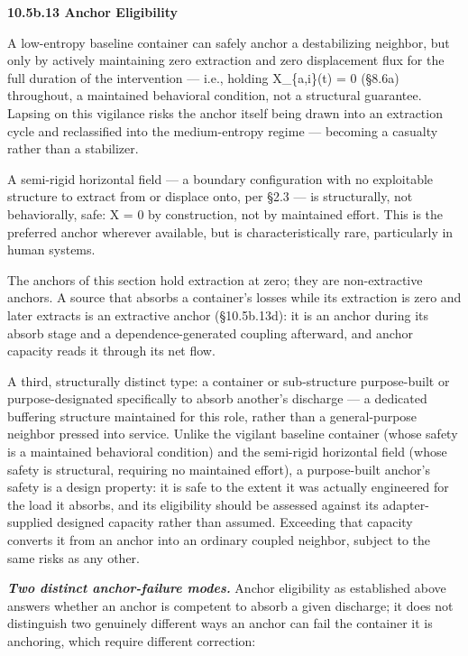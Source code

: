 \documentclass[
]{article}
\begin{document}
\textbf{10.5b.13 Anchor Eligibility}

A low-entropy baseline container can safely anchor a destabilizing
neighbor, but only by actively maintaining zero extraction and zero
displacement flux for the full duration of the intervention --- i.e.,
holding X\_\{a,i\}(t) = 0 (§8.6a) throughout, a maintained behavioral
condition, not a structural guarantee. Lapsing on this vigilance risks
the anchor itself being drawn into an extraction cycle and reclassified
into the medium-entropy regime --- becoming a casualty rather than a
stabilizer.

A semi-rigid horizontal field --- a boundary configuration with no
exploitable structure to extract from or displace onto, per §2.3 --- is
structurally, not behaviorally, safe: X = 0 by construction, not by
maintained effort. This is the preferred anchor wherever available, but
is characteristically rare, particularly in human systems.

The anchors of this section hold extraction at zero; they are
non-extractive anchors. A source that absorbs a container's losses while
its extraction is zero and later extracts is an extractive anchor
(§10.5b.13d): it is an anchor during its absorb stage and a
dependence-generated coupling afterward, and anchor capacity reads it
through its net flow.

A third, structurally distinct type: a container or sub-structure
purpose-built or purpose-designated specifically to absorb another's
discharge --- a dedicated buffering structure maintained for this role,
rather than a general-purpose neighbor pressed into service. Unlike the
vigilant baseline container (whose safety is a maintained behavioral
condition) and the semi-rigid horizontal field (whose safety is
structural, requiring no maintained effort), a purpose-built anchor's
safety is a design property: it is safe to the extent it was actually
engineered for the load it absorbs, and its eligibility should be
assessed against its adapter-supplied designed capacity rather than
assumed. Exceeding that capacity converts it from an anchor into an
ordinary coupled neighbor, subject to the same risks as any other.

\emph{\textbf{Two distinct anchor-failure modes.}} Anchor eligibility as
established above answers whether an anchor is competent to absorb a
given discharge; it does not distinguish two genuinely different ways an
anchor can fail the container it is anchoring, which require different
correction:
\end{document}
